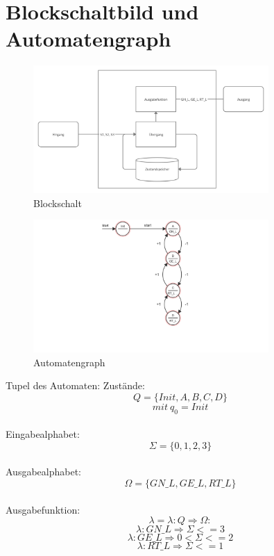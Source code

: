 \section{Blockschaltbild und Automatengraph}

\begin{figure}[H]
    \begin{center}
        \includegraphics[width=0.8\textwidth]{img/Blockschalt.png}
        \caption{Blockschalt}
        \label{fig:A1_Block}
    \end{center}
\end{figure}


\begin{figure}[H]
    \begin{center}
        \includegraphics[width=0.8\textwidth]{img/Motortemp.png}
        \caption{Automatengraph}
        \label{fig:A1_Auto}
    \end{center}
\end{figure}
Tupel des Automaten:
Zustände:
\[Q =\{Init, A, B, C, D\}  \]
\[mit \ q_0 = Init \]\\
Eingabealphabet:
\[\Sigma =\{0,1,2,3\} \]\\
Ausgabealphabet:
\[\Omega = \{GN\_L, GE\_L, RT\_L\} \]\\
Ausgabefunktion:
\[\lambda = \lambda  : Q \Rightarrow \Omega: \]
\[  \lambda:GN\_L \Rightarrow \Sigma <= 3 \]
\[  \lambda:GE\_L \Rightarrow 0 < \Sigma <= 2  \]
\[  \lambda:RT\_L \Rightarrow  \Sigma <= 1  \]\\


